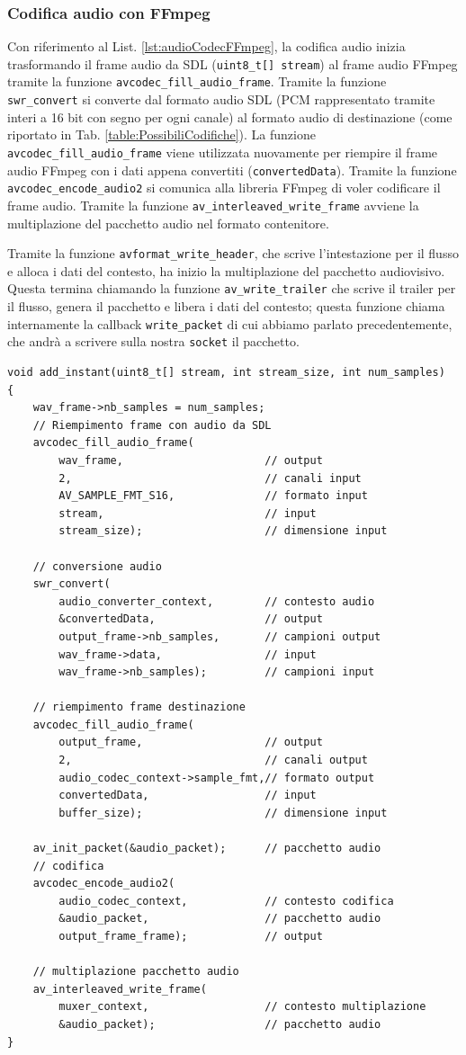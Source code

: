 \subsubsection{Codifica audio con FFmpeg}
Con riferimento al List. \ref{lst:audioCodecFFmpeg}, la codifica audio inizia trasformando il frame audio da SDL (\verb|uint8_t[] stream|) al frame audio FFmpeg tramite la funzione \verb|avcodec_fill_audio_frame|. Tramite la funzione \verb|swr_convert| si converte dal formato audio SDL (PCM rappresentato tramite interi a 16 bit con segno per ogni canale) al formato audio di destinazione (come riportato in Tab. \ref{table:PossibiliCodifiche}). La funzione \verb|avcodec_fill_audio_frame| viene utilizzata nuovamente per riempire il frame audio FFmpeg con i dati appena convertiti (\verb|convertedData|). Tramite la funzione \verb|avcodec_encode_audio2| si comunica alla libreria FFmpeg di voler codificare il frame audio. Tramite la funzione \verb|av_interleaved_write_frame| avviene la multiplazione del pacchetto audio nel formato contenitore.

Tramite la funzione \verb|avformat_write_header|, che scrive l'intestazione per il flusso e alloca i dati del contesto, ha inizio la multiplazione del pacchetto audiovisivo. Questa termina chiamando la funzione \verb|av_write_trailer| che scrive il trailer per il flusso, genera il pacchetto e libera i dati del contesto; questa funzione chiama internamente la callback \verb|write_packet| di cui abbiamo parlato precedentemente, che andrà a scrivere sulla nostra \verb|socket| il pacchetto.

\begin{lstlisting}[caption=Codice per la codifica audio. File: \detokenize{lib/util/encoding/encode_to_movie.hpp}, label={lst:audioCodecFFmpeg}]
void add_instant(uint8_t[] stream, int stream_size,	int num_samples)
{
	wav_frame->nb_samples = num_samples;
	// Riempimento frame con audio da SDL
	avcodec_fill_audio_frame(
		wav_frame,						// output
		2,								// canali input
		AV_SAMPLE_FMT_S16,				// formato input
		stream,							// input
		stream_size);					// dimensione input			

	// conversione audio
	swr_convert(
		audio_converter_context,		// contesto audio
		&convertedData,					// output
		output_frame->nb_samples,		// campioni output
		wav_frame->data,				// input
		wav_frame->nb_samples);			// campioni input

	// riempimento frame destinazione
	avcodec_fill_audio_frame(
		output_frame, 					// output
		2,								// canali output
		audio_codec_context->sample_fmt,// formato output
		convertedData,					// input
		buffer_size);					// dimensione input			
			
	av_init_packet(&audio_packet);		// pacchetto audio	
	// codifica
	avcodec_encode_audio2(
		audio_codec_context,			// contesto codifica
		&audio_packet,					// pacchetto audio
		output_frame_frame);			// output			
	
	// multiplazione pacchetto audio
	av_interleaved_write_frame(
		muxer_context,					// contesto multiplazione
		&audio_packet);					// pacchetto audio
}
\end{lstlisting}



